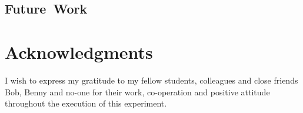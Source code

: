 \documentclass[fleqn,10pt]{SelfArx} %
\newlength{\tocsep}
\begin{document}
\subsection{Future~Work}
\label{sec:conclusion:futurework}

\section*{Acknowledgments} %
\label{sec:acknowledgments}
I wish to express my gratitude to my fellow students, colleagues and close friends Bob, Benny and no-one for their work, co-operation and positive attitude throughout the execution of this experiment.



\end{document}

